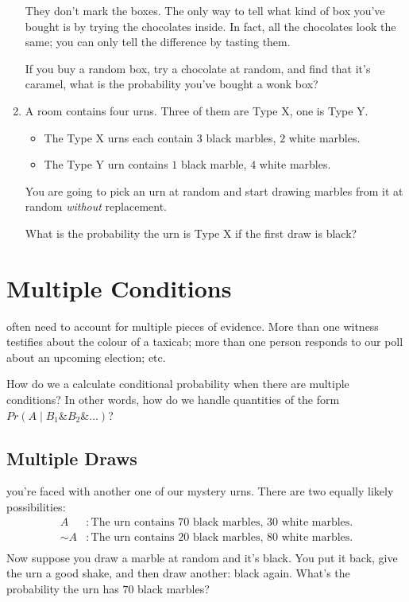 \documentclass[justified]{tufte-book}
\providecommand{\tightlist}{%
  \setlength{\itemsep}{0pt}\setlength{\parskip}{0pt}}
\newcommand{\given}{\mid}
\renewcommand{\neg}{\mathbin{\sim}}
\renewcommand{\wedge}{\mathbin{\&}}
\newcommand{\p}{Pr}
\theoremstyle{definition}
\theoremstyle{definition}
\theoremstyle{definition}
\theoremstyle{remark}
\begin{document}
\begin{enumerate}
  They don't mark the boxes. The only way to tell what kind of box
  you've bought is by trying the chocolates inside. In fact, all the
  chocolates look the same; you can only tell the difference by tasting
  them.

  If you buy a random box, try a chocolate at random, and find that it's
  caramel, what is the probability you've bought a wonk box?
\item
  A room contains four urns. Three of them are Type X, one is Type Y.

  \begin{itemize}
  \tightlist
  \item
    The Type X urns each contain \(3\) black marbles, \(2\) white
    marbles.
  \item
    The Type Y urn contains \(1\) black marble, \(4\) white marbles.
  \end{itemize}

  You are going to pick an urn at random and start drawing marbles from
  it at random \emph{without} replacement.

  What is the probability the urn is Type X if the first draw is black?
\end{enumerate}

\hypertarget{multiple-conditions}{%
\chapter{Multiple Conditions}\label{multiple-conditions}}

 often need to account for multiple pieces of evidence.
More than one witness testifies about the colour of a taxicab; more than
one person responds to our poll about an upcoming election; etc.

How do we a calculate conditional probability when there are multiple
conditions? In other words, how do we handle quantities of the form
\(\p(A \given B_1 \wedge B_2 \wedge \ldots)\)?

\hypertarget{multiple-draws}{%
\section{Multiple Draws}\label{multiple-draws}}

 you're faced with another one of our mystery urns.
There are two equally likely possibilities: \[
  \begin{aligned}
    A      &: \mbox{The urn contains $70$ black marbles, $30$ white marbles.}\\
    \neg A &: \mbox{The urn contains $20$ black marbles, $80$ white marbles.}\\
  \end{aligned}
\] Now suppose you draw a marble at random and it's black. You put it
back, give the urn a good shake, and then draw another: black again.
What's the probability the urn has \(70\) black marbles?
\end{document}
